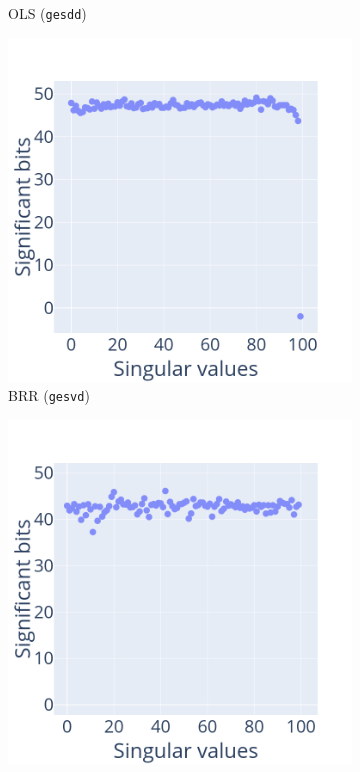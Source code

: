 \documentclass[10pt,journal,compsoc]{IEEEtran}
\begin{document}
\begin{figure}
\begin{subfigure}{0.49\linewidth}
        \caption{OLS (\texttt{gesdd})}
        \label{fig:OLS_svd}
    \end{subfigure}
    \begin{subfigure}{0.49\linewidth}
        \includegraphics[width=\linewidth]{figure/BRR_singular_values_fixed.png}
        \caption{BRR (\texttt{gesvd})}
        \label{fig:BRR_svd_fixed}
    \end{subfigure}
    \begin{subfigure}{0.49\linewidth}
        \includegraphics[width=\linewidth]{figure/OLS_singular_values_fixed.png}

\end{subfigure}
\end{figure}
\end{document}
